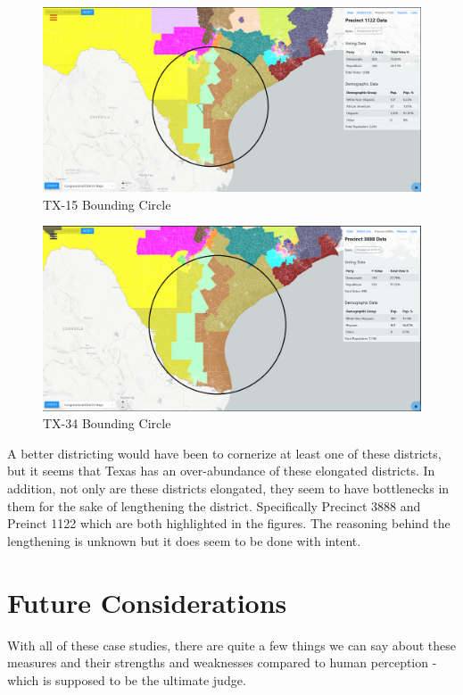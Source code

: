 \documentclass[letterpaper]{article}
\begin{document}
\begin{figure}[H]
	\includegraphics[width=\linewidth]{./figures/TX-15-BoundingCircle.png}
	\caption{TX-15 Bounding Circle}
	\label{fig:tx15boundingCircle}
\end{figure}

\begin{figure}[H]
	\includegraphics[width=\linewidth]{./figures/TX-34-BoundingCircle.png}
	\caption{TX-34 Bounding Circle}
	\label{fig:tx34boundingCircle}
\end{figure}

A better districting would have been to cornerize at least one of these districts, but it seems that Texas has an over-abundance of these elongated districts. In addition, not only are these districts elongated, they seem to have bottlenecks in them for the sake of lengthening the district. Specifically Precinct 3888 and Preinct 1122 which are both highlighted in the figures. The reasoning behind the lengthening is unknown but it does seem to be done with intent.

\section{Future Considerations}
With all of these case studies, there are quite a few things we can say about these measures and their strengths and weaknesses compared to human perception - which is supposed to be the ultimate judge.
\end{document}
